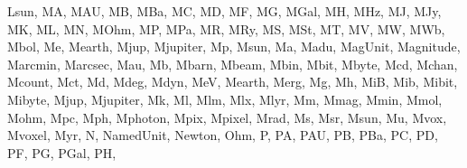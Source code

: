 \documentclass[letterpaper,10pt,english]{sphinxmanual}
\begin{document}
\begin{sphinxVerbatim}[commandchars=\\\{\}]
 \PYGZsq{}Lsun\PYGZsq{},
 \PYGZsq{}MA\PYGZsq{},
 \PYGZsq{}MAU\PYGZsq{},
 \PYGZsq{}MB\PYGZsq{},
 \PYGZsq{}MBa\PYGZsq{},
 \PYGZsq{}MC\PYGZsq{},
 \PYGZsq{}MD\PYGZsq{},
 \PYGZsq{}MF\PYGZsq{},
 \PYGZsq{}MG\PYGZsq{},
 \PYGZsq{}MGal\PYGZsq{},
 \PYGZsq{}MH\PYGZsq{},
 \PYGZsq{}MHz\PYGZsq{},
 \PYGZsq{}MJ\PYGZsq{},
 \PYGZsq{}MJy\PYGZsq{},
 \PYGZsq{}MK\PYGZsq{},
 \PYGZsq{}ML\PYGZsq{},
 \PYGZsq{}MN\PYGZsq{},
 \PYGZsq{}MOhm\PYGZsq{},
 \PYGZsq{}MP\PYGZsq{},
 \PYGZsq{}MPa\PYGZsq{},
 \PYGZsq{}MR\PYGZsq{},
 \PYGZsq{}MRy\PYGZsq{},
 \PYGZsq{}MS\PYGZsq{},
 \PYGZsq{}MSt\PYGZsq{},
 \PYGZsq{}MT\PYGZsq{},
 \PYGZsq{}MV\PYGZsq{},
 \PYGZsq{}MW\PYGZsq{},
 \PYGZsq{}MWb\PYGZsq{},
 \PYGZsq{}M\PYGZus{}bol\PYGZsq{},
 \PYGZsq{}M\PYGZus{}e\PYGZsq{},
 \PYGZsq{}M\PYGZus{}earth\PYGZsq{},
 \PYGZsq{}M\PYGZus{}jup\PYGZsq{},
 \PYGZsq{}M\PYGZus{}jupiter\PYGZsq{},
 \PYGZsq{}M\PYGZus{}p\PYGZsq{},
 \PYGZsq{}M\PYGZus{}sun\PYGZsq{},
 \PYGZsq{}Ma\PYGZsq{},
 \PYGZsq{}Madu\PYGZsq{},
 \PYGZsq{}MagUnit\PYGZsq{},
 \PYGZsq{}Magnitude\PYGZsq{},
 \PYGZsq{}Marcmin\PYGZsq{},
 \PYGZsq{}Marcsec\PYGZsq{},
 \PYGZsq{}Mau\PYGZsq{},
 \PYGZsq{}Mb\PYGZsq{},
 \PYGZsq{}Mbarn\PYGZsq{},
 \PYGZsq{}Mbeam\PYGZsq{},
 \PYGZsq{}Mbin\PYGZsq{},
 \PYGZsq{}Mbit\PYGZsq{},
 \PYGZsq{}Mbyte\PYGZsq{},
 \PYGZsq{}Mcd\PYGZsq{},
 \PYGZsq{}Mchan\PYGZsq{},
 \PYGZsq{}Mcount\PYGZsq{},
 \PYGZsq{}Mct\PYGZsq{},
 \PYGZsq{}Md\PYGZsq{},
 \PYGZsq{}Mdeg\PYGZsq{},
 \PYGZsq{}Mdyn\PYGZsq{},
 \PYGZsq{}MeV\PYGZsq{},
 \PYGZsq{}Mearth\PYGZsq{},
 \PYGZsq{}Merg\PYGZsq{},
 \PYGZsq{}Mg\PYGZsq{},
 \PYGZsq{}Mh\PYGZsq{},
 \PYGZsq{}MiB\PYGZsq{},
 \PYGZsq{}Mib\PYGZsq{},
 \PYGZsq{}Mibit\PYGZsq{},
 \PYGZsq{}Mibyte\PYGZsq{},
 \PYGZsq{}Mjup\PYGZsq{},
 \PYGZsq{}Mjupiter\PYGZsq{},
 \PYGZsq{}Mk\PYGZsq{},
 \PYGZsq{}Ml\PYGZsq{},
 \PYGZsq{}Mlm\PYGZsq{},
 \PYGZsq{}Mlx\PYGZsq{},
 \PYGZsq{}Mlyr\PYGZsq{},
 \PYGZsq{}Mm\PYGZsq{},
 \PYGZsq{}Mmag\PYGZsq{},
 \PYGZsq{}Mmin\PYGZsq{},
 \PYGZsq{}Mmol\PYGZsq{},
 \PYGZsq{}Mohm\PYGZsq{},
 \PYGZsq{}Mpc\PYGZsq{},
 \PYGZsq{}Mph\PYGZsq{},
 \PYGZsq{}Mphoton\PYGZsq{},
 \PYGZsq{}Mpix\PYGZsq{},
 \PYGZsq{}Mpixel\PYGZsq{},
 \PYGZsq{}Mrad\PYGZsq{},
 \PYGZsq{}Ms\PYGZsq{},
 \PYGZsq{}Msr\PYGZsq{},
 \PYGZsq{}Msun\PYGZsq{},
 \PYGZsq{}Mu\PYGZsq{},
 \PYGZsq{}Mvox\PYGZsq{},
 \PYGZsq{}Mvoxel\PYGZsq{},
 \PYGZsq{}Myr\PYGZsq{},
 \PYGZsq{}N\PYGZsq{},
 \PYGZsq{}NamedUnit\PYGZsq{},
 \PYGZsq{}Newton\PYGZsq{},
 \PYGZsq{}Ohm\PYGZsq{},
 \PYGZsq{}P\PYGZsq{},
 \PYGZsq{}PA\PYGZsq{},
 \PYGZsq{}PAU\PYGZsq{},
 \PYGZsq{}PB\PYGZsq{},
 \PYGZsq{}PBa\PYGZsq{},
 \PYGZsq{}PC\PYGZsq{},
 \PYGZsq{}PD\PYGZsq{},
 \PYGZsq{}PF\PYGZsq{},
 \PYGZsq{}PG\PYGZsq{},
 \PYGZsq{}PGal\PYGZsq{},
 \PYGZsq{}PH\PYGZsq{},

\end{sphinxVerbatim}
\end{document}
